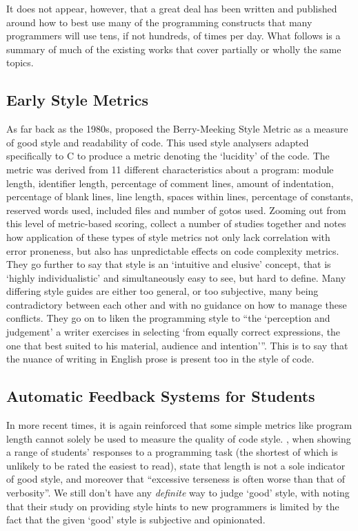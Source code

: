 \documentclass{article}
\begin{document}
    It does not appear, however, that a great deal has been written and published around how to best use many of the programming constructs that many programmers will use tens, if not hundreds, of times per day. What follows is a summary of much of the existing works that cover partially or wholly the same topics.
    \subsection{Early Style Metrics}
        As far back as the 1980s, \cite{berryMeekingStyle} proposed the Berry-Meeking Style Metric as a measure of good style and readability of code. This used style analysers adapted specifically to C to produce a metric denoting the `lucidity' of the code. The metric was derived from 11 different characteristics about a program: module length, identifier length, percentage of comment lines, amount of indentation, percentage of blank lines, line length, spaces within lines, percentage of constants, reserved words used, included files and number of gotos used. Zooming out from this level of metric-based scoring, \cite{paradigmForStyleResearch} collect a number of studies together and notes how application of these types of style metrics not only lack correlation with error proneness, but also has unpredictable effects on code complexity metrics. They go further to say that style is an `intuitive and elusive' concept, that is `highly individualistic' and simultaneously easy to see, but hard to define. Many differing style guides are either too general, or too subjective, many being contradictory between each other and with no guidance on how to manage these conflicts. They go on to liken the programming style to ``the `perception and judgement' a writer exercises in selecting `from equally correct expressions, the one that best suited to his material, audience and intention'''. This is to say that the nuance of writing in English prose is present too in the style of code.

    \subsection{Automatic Feedback Systems for Students}
        In more recent times, it is again reinforced that some simple metrics like program length cannot solely be used to measure the quality of code style. \cite{autoStyleFeedbackAtScale}, when showing a range of students' responses to a programming task (the shortest of which is unlikely to be rated the easiest to read), state that length is not a sole indicator of good style, and moreover that ``excessive terseness is often worse than that of verbosity''. We still don't have any \emph{definite} way to judge `good' style, with \cite{scaleDrivenHints} noting that their study on providing style hints to new programmers is limited by the fact that the given `good' style is subjective and opinionated.
\end{document}
